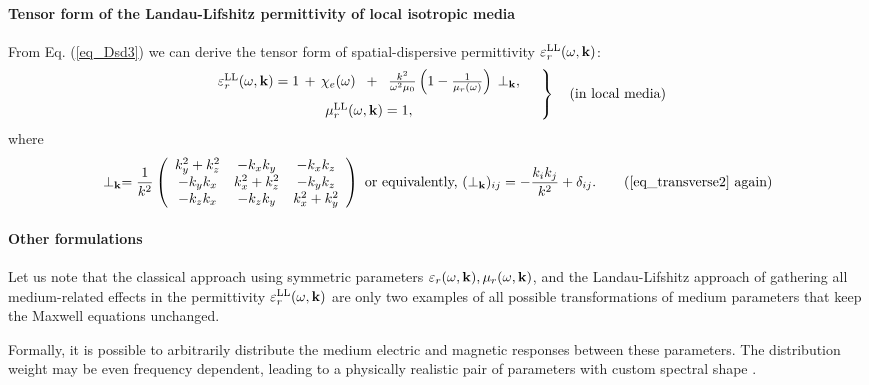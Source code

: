 \paragraph{Tensor form of the Landau-Lifshitz permittivity of local isotropic media}%
From Eq. (\ref{eq_Dsd3}) we can derive the tensor form of spatial-dispersive permittivity $\varepsilon_r^\text{LL}(\omega,{\mathbf{k}})$:
\begin{equation} 
\left.  \begin{array}{c}
\epsLL(\omega,\kk) = 1 \,+\, \chi_e(\omega) \;\;+\;\; \frac{k^2}{\omega^2 \mu_0}\left(1 - \frac{1}{\murl(\omega)}\right) \, \TT, \medskip \\
\muLL(\omega,\kk) = 1, 
\end{array} \quad \right\} \quad \text{(in local media)}
\label{eq_epsmusd3} \end{equation} 
where 
\begin{equation} \TT = \frac{1}{k^2} 
\left(\begin{array}{ccc} 
	k_y^2+k_z^2		& -k_x k_y		& -k_x k_z \\ 
	-k_y k_x		& k_x^2+k_z^2	& -k_y k_z \\ 
	-k_z k_x		& -k_z k_y		& k_x^2+k_y^2
	\end{array} \right) 
\text{ or equivalently, }
(\TT)_{ij} = - \frac{k_i k_j}{k^2} + \delta_{ij} . \tag{\ref{eq_transverse2} \again} \end{equation}

\paragraph{Other formulations}%
Let us note that the classical approach using symmetric parameters $\varepsilon_r(\omega,{\mathbf{k}}),\mu_r(\omega,{\mathbf{k}})$, and the Landau-Lifshitz approach of gathering all medium-related effects in the permittivity $\varepsilon_r^\text{LL}(\omega,{\mathbf{k}})$ are only two examples of all possible transformations of medium parameters that keep the Maxwell equations unchanged. 

Formally, it is possible to arbitrarily distribute the medium electric and magnetic responses between these parameters. The distribution weight may be even frequency dependent, leading to a physically realistic pair of parameters with custom spectral shape \cite{skaar2014diamagnetism}.

